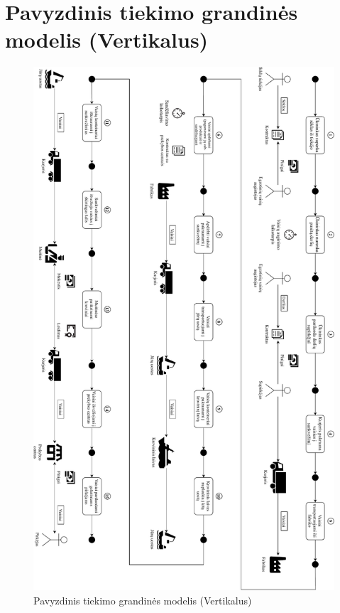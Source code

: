 \appendix  

\section{Pavyzdinis tiekimo grandinės modelis (Vertikalus)}
\begin{figure}[H]
    \centering
    \includegraphics[scale=0.50]{images/supply-chain-vertical}
    \caption{Pavyzdinis tiekimo grandinės modelis (Vertikalus)}
\end{figure}


